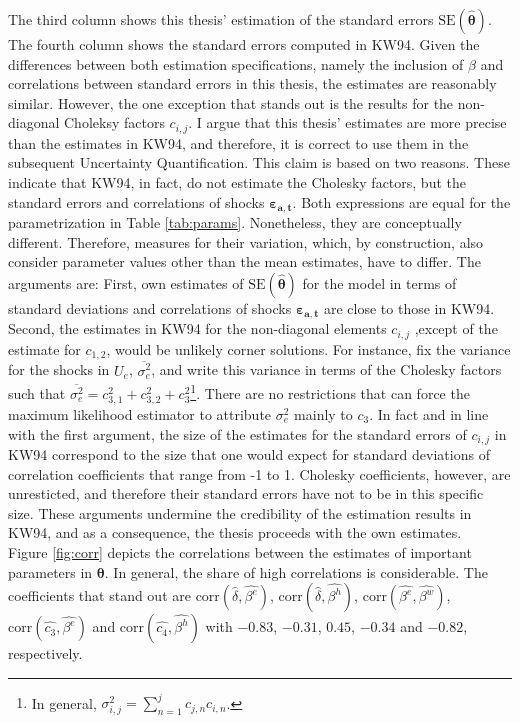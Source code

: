 The third column shows this thesis' estimation of the standard errors $\text{SE}(\pmb{\hat{\theta}})$. The fourth column shows the standard errors computed in KW94. Given the differences between both estimation specifications, namely the inclusion of $\beta$ and correlations between standard errors in this thesis, the estimates are reasonably similar. However, the one exception that stands out is the results for the non-diagonal Choleksy factors $c_{i,j}$. I argue that this thesis' estimates are more precise than the estimates in KW94, and therefore, it is correct to use them in the subsequent Uncertainty Quantification. This claim is based on two reasons. These indicate that KW94, in fact, do not estimate the Cholesky factors, but the standard errors and correlations of shocks $\pmb{\varepsilon_{a,t}}$. Both expressions are equal for the parametrization in Table \ref{tab:params}. Nonetheless, they are conceptually different. Therefore, measures for their variation, which, by construction, also consider parameter values other than the mean estimates, have to differ. The arguments are: First, own estimates of $\text{SE}(\pmb{\hat{\theta}})$ for the model in terms of standard deviations and correlations of shocks $\pmb{\varepsilon_{a,t}}$ are close to those in KW94. Second, the estimates in KW94 for the non-diagonal elements $c_{i,j}$ ,except of the estimate for $c_{1,2}$, would be unlikely corner solutions. For instance, fix the variance for the shocks in $U_e$, $\overline{\sigma_e^2}$, and write this variance in terms of the Cholesky factors such that $\overline{\sigma_e^2}=c_{3,1}^2+c_{3,2}^2+c_{3}^2$\footnote{In general, $\sigma_{i,j}^2 = \sum_{n=1}^{j} c_{j,n}c_{i,n}$.}. There are no restrictions that can force the maximum likelihood estimator to attribute $\sigma_e^2$ mainly to $c_{3}$. In fact and in line with the first argument, the size of the estimates for the standard errors of $c_{i,j}$ in KW94 correspond to the size that one would expect for standard deviations of correlation coefficients that range from -1 to 1. Cholesky coefficients, however, are unresticted, and therefore their standard errors have not to be in this specific size. These arguments undermine the credibility of the estimation results in KW94, and as a consequence, the thesis proceeds with the own estimates.\\

\noindent
Figure \ref{fig:corr} depicts the correlations between the estimates of important parameters in $\pmb{\theta}$. In general, the share of high correlations is considerable. The coefficients that stand out are $\text{corr}(\hat{\delta},\hat{\beta^e})$, $\text{corr}(\hat{\delta},\hat{\beta^h})$, $\text{corr}(\hat{\beta^e},\hat{\beta^w})$, $\text{corr}(\hat{c_3},\hat{\beta^e})$ and $\text{corr}(\hat{c_4},\hat{\beta^h})$ with $-0.83$, $-0.31$, $0.45$, $-0.34$ and $-0.82$, respectively. 

